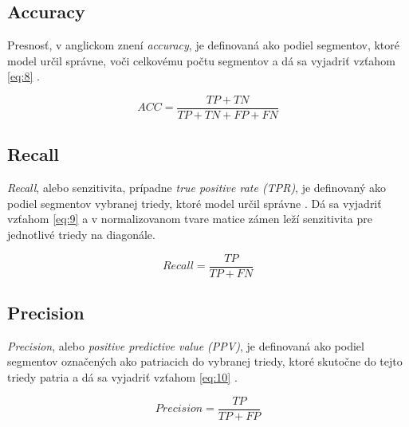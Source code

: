 \subsection{Accuracy}

Presnosť, v anglickom znení \textit{accuracy}, je definovaná ako podiel segmentov, ktoré model určil správne, voči celkovému počtu segmentov a dá sa vyjadriť vzťahom \ref{eq:8} \cite{grandini2020metrics}.

\begin{equation} 
    \label{eq:8}
    ACC = \frac{TP + TN}{TP + TN + FP + FN}
\end{equation}

\subsection{Recall}

\textit{Recall}, alebo senzitivita, prípadne \textit{true positive rate (TPR)}, je definovaný ako podiel segmentov vybranej triedy, ktoré model určil správne \cite{grandini2020metrics}. Dá sa vyjadriť vzťahom \ref{eq:9} a v normalizovanom tvare matice zámen leží senzitivita pre jednotlivé triedy na diagonále.

\begin{equation} 
    \label{eq:9}
    Recall = \frac{TP}{TP + FN}
\end{equation}

\subsection{Precision}

\textit{Precision}, alebo \textit{positive predictive value (PPV)}, je definovaná ako podiel segmentov označených ako patriacich do vybranej triedy, ktoré skutočne do tejto triedy patria a dá sa vyjadriť vzťahom \ref{eq:10} \cite{grandini2020metrics}.

\begin{equation} 
    \label{eq:10}
    Precision = \frac{TP}{TP + FP}
\end{equation}

